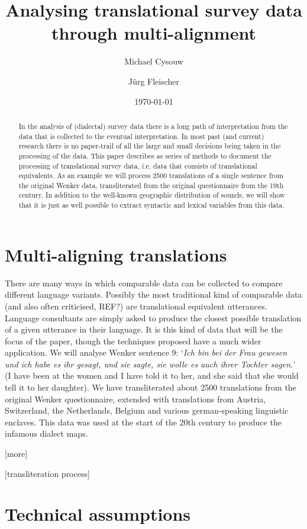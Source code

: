 \documentclass[11pt]{article}
\title{Analysing translational survey data through multi-alignment}
\author{Michael Cysouw \and Jürg Fleischer}
\date{\today}
\begin{document}
  
\maketitle
  
\begin{abstract}
In the analysis of (dialectal) survey data there is a long path of interpretation from the data that is collected to the eventual interpretation. In most past (and current) research there is no paper-trail of all the large and small decisions being taken in the processing of the data. This paper describes as series of methods to document the processing of translational survey data, i.e. data that consists of translational equivalents. As an example we will process 2500 translations of a single sentence from the original Wenker data, transliterated from the original questionnaire from the 19th century. In addition to the well-known geographic distribution of sounds, we will show that it is just as well possible to extract syntactic and lexical variables from this data.
\end{abstract}

\section{Multi-aligning translations}

There are many ways in which comparable data can be collected to compare different language variants. Possibly the most traditional kind of comparable data (and also often criticised, REF?) are translational equivalent utterances. Language consultants are simply asked to produce the closest possible translation of a given utterance in their language. It is this kind of data that will be the focus of the paper, though the techniques proposed have a much wider application. We will analyse Wenker sentence 9: `\textit{Ich bin bei der Frau gewesen und ich habe es ihr gesagt, und sie sagte, sie wolle es auch ihrer Tochter sagen.}' (I have been at the women and I have told it to her, and she said that she would tell it to her daughter). We have transliterated about 2500 translations from the original Wenker questionnaire, extended with translations from Austria, Switzerland, the Netherlands, Belgium and various german-speaking linguistic enclaves. This data was used at the start of the 20th century to produce the infamous dialect maps.

[more]

[transliteration process]

\section{Technical assumptions}
\end{document}
